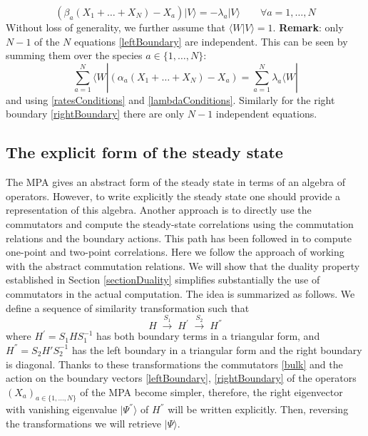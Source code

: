 \documentclass[11pt]{article}
\numberwithin{equation}{section}
\numberwithin{equation}{subsection}
\begin{document}
\begin{equation}\label{rightBoundary}
	\left(\beta_{a}(X_{1}+\ldots+X_{N})-X_{a}\right)|V\rangle=-\lambda_{a}|V\rangle\qquad\forall a=1,\ldots,N
\end{equation}
Without loss of generality, we further assume that $\langle W|V\rangle=1$. 
\newline \newline
\textbf{Remark}: only $N-1$ of the $N$ equations \eqref{leftBoundary}  are independent. This can be seen by summing them over the species $a\in \{1,\ldots,N\}$:
	\begin{equation}
		\sum_{a=1}^{N}	\langle W|\left(\alpha_{a}(X_{1}+\ldots+X_{N})-X_{a}\right)=\sum_{a=1}^{N}\lambda_{a}\langle W|
	\end{equation}
	and using  \eqref{ratesConditions} and \eqref{lambdaConditions}.
 Similarly for the right boundary  \eqref{rightBoundary} there are only  $N-1$ independent equations.
\subsection{The explicit form of the steady state}\label{subsection-exact}
The MPA gives an abstract form of the steady state in terms of an algebra of operators. However, to write explicitly the steady state one should provide a representation of this algebra. Another approach is to directly use the commutators and compute the steady-state correlations using the commutation relations and the boundary actions. This path has been followed in \cite{vanicat2017exact} to compute one-point and two-point correlations. 
Here we follow the approach of working with the abstract commutation  relations. We will show that the duality property established in Section \ref{sectionDuality} simplifies substantially the  use of commutators in the actual
computation. The idea is summarized as follows. We define a sequence of similarity transformation such that 
\begin{equation}
	H\;\xrightarrow{S_{1}}\;H^{'}\;\xrightarrow{S_{2}}\;H^{''}
\end{equation} 
where $H^{'}= S_{1} H S_{1}^{-1} $ has both boundary terms in a triangular form, and $H^{''} = S_{2}H' S_{2}^{-1}$ has the left boundary in a triangular form and the right boundary is diagonal. Thanks to these transformations the commutators \eqref{bulk} and the action on the boundary vectors \eqref{leftBoundary}, \eqref{rightBoundary} of the operators $(X_{a})_{a\in\{1,\ldots,N\}}$ of the MPA become simpler, therefore, the right eigenvector with vanishing eigenvalue $|\Psi^{''}\rangle$ of $H^{''}$ will be written explicitly. Then, reversing the transformations we will retrieve $|\Psi\rangle$.
\end{document}
